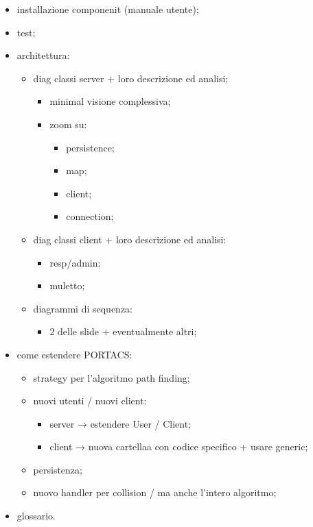 \begin{itemize}
	\item installazione componenit (manuale utente);
	
	\item test;
	
	\item architettura:
	\begin{itemize}
	
	
	\item diag classi server + loro descrizione ed analisi;
	\begin{itemize}
	\item minimal visione complessiva;
	
	\item zoom su:
	\begin{itemize}
	\item persistence;
	
	\item map;
	
	\item client;
	
	\item connection;
\end{itemize}
\end{itemize}
	\item diag classi client + loro descrizione ed analisi:
	\begin{itemize}
	\item resp/admin;
	
	\item muletto;
\end{itemize}
	\item diagrammi di sequenza:
	\begin{itemize}
		\item 2 delle slide + eventualmente altri;
	\end{itemize}
\end{itemize}
	\item come estendere PORTACS:
	\begin{itemize}
	
	\item strategy per l’algoritmo path finding;
	
	\item nuovi utenti / nuovi client:
	\begin{itemize}
	
	\item server → estendere User / Client;
	
	\item client → nuova cartellaa con codice specifico + usare generic;
\end{itemize}
	
	\item persistenza;
	
	\item nuovo handler per collision / ma anche l’intero algoritmo;
\end{itemize}
	
	\item glossario.
	\end{itemize}